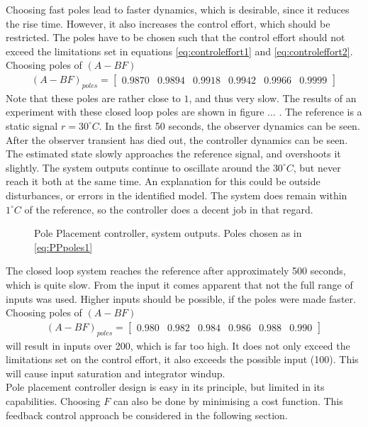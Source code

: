 Choosing fast poles lead to faster dynamics, which is desirable, since it reduces the rise time. However, it also increases the control effort, which should be restricted. The poles have to be chosen such that the control effort should not exceed the limitations set in equations \ref{eq:controleffort1} and \ref{eq:controleffort2}. Choosing poles of $(A-BF)$
\begin{align}
    (A-BF)_{poles} = \begin{bmatrix} 0.9870 & 0.9894 & 0.9918 & 0.9942 & 0.9966 & 0.9999 \end{bmatrix} \label{eq:PPpoles1}
\end{align}
Note that these poles are rather close to $1$, and thus very slow. The results of an experiment with these closed loop poles are shown in figure ... . The reference is a static signal $r = 30^{\circ}C$. In the first 50 seconds, the observer dynamics can be seen. After the observer transient has died out, the controller dynamics can be seen. The estimated state slowly approaches the reference signal, and overshoots it slightly. The system outputs continue to oscillate around the $30^{\circ}C$, but never reach it both at the same time. An explanation for this could be outside disturbances, or errors in the identified model. The system does remain within $1^{\circ}C$ of the reference, so the controller does a decent job in that regard.
\begin{figure}
    \centering
    
    \caption{Pole Placement controller, system outputs. Poles chosen as in \ref{eq:PPpoles1}}
    \label{fig:PPexp1}
\end{figure}
The closed loop system reaches the reference after approximately 500 seconds, which is quite slow. From the input it comes apparent that not the full range of inputs was used. Higher inputs should be possible, if the poles were made faster. Choosing poles of $(A-BF)$
\begin{align}
    (A-BF)_{poles} = \begin{bmatrix} 0.980 & 0.982 & 0.984 & 0.986 & 0.988 & 0.990 \end{bmatrix} \label{eq:PPpoles2}
\end{align}
will result in inputs over 200, which is far too high. It does not only exceed the limitations set on the control effort, it also exceeds the possible input (100). This will cause input saturation and integrator windup.\\
Pole placement controller design is easy in its principle, but limited in its capabilities. Choosing $F$ can also be done by minimising a cost function. This feedback control approach be considered in the following section.

